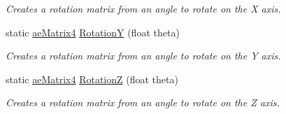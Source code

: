 \begin{DoxyCompactItemize}
\begin{DoxyCompactList}\small\item\em Creates a rotation matrix from an angle to rotate on the X axis. \end{DoxyCompactList}\item 
static \hyperlink{structae_core_1_1ae_matrix4}{ae\+Matrix4} \hyperlink{structae_core_1_1ae_matrix4_ab95a9635b9527b04eb97ab3438c68a64}{RotationY} (float theta)
\begin{DoxyCompactList}\small\item\em Creates a rotation matrix from an angle to rotate on the Y axis. \end{DoxyCompactList}\item 
static \hyperlink{structae_core_1_1ae_matrix4}{ae\+Matrix4} \hyperlink{structae_core_1_1ae_matrix4_a77ea610234c754d39212622b94ab5f48}{RotationZ} (float theta)
\begin{DoxyCompactList}\small\item\em Creates a rotation matrix from an angle to rotate on the Z axis. \end{DoxyCompactList}\end{DoxyCompactItemize}
